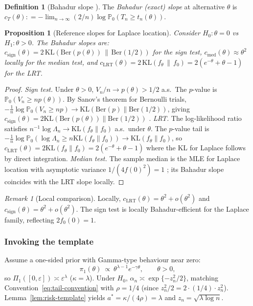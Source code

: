 \documentclass[11pt]{article}
\newcommand{\defeq}{\mathrel{\mathop:}=}
\newcommand{\KL}{\mathrm{KL}}
\newcommand{\rhotail}{\rho}  %
\newcommand{\1}{\mathbf{1}}
\newcommand{\PP}{\mathbb{P}}
\theoremstyle{plain}
\newtheorem{proposition}[theorem]{Proposition}
\theoremstyle{definition}
\newtheorem{definition}[theorem]{Definition}
\theoremstyle{remark}
\newtheorem{remark}[theorem]{Remark}
\begin{document}
\begin{definition}[Bahadur slope {\citep{Bahadur1960, Sievers1969}}]\label{def:bahadur-slope}
The \emph{Bahadur (exact) slope} at alternative $\theta$ is
$c_T(\theta) \defeq -\lim_{n\to\infty}(2/n)\log\PP_{0}(T_n\ge t_n(\theta))$.
\end{definition}

\begin{proposition}[Reference slopes for Laplace location]\label{prop:laplace-bahadur}
Consider $H_0:\theta=0$ vs $H_1:\theta>0$.
The Bahadur slopes are:
$c_{\mathrm{sign}}(\theta) = 2\,\KL(\mathrm{Ber}(p(\theta))\,\|\,\mathrm{Ber}(1/2))$ for the sign test,
$c_{\mathrm{med}}(\theta)\approx \theta^2$ locally for the median test, and
$c_{\mathrm{LRT}}(\theta) = 2\,\KL(f_{\theta}\,\|\,f_0) = 2(e^{-\theta}+\theta-1)$ for the LRT.
\end{proposition}

\begin{proof}
\emph{Sign test.}
Under $\theta>0$, $V_n/n\to p(\theta)>1/2$ a.s.\ The $p$-value is $\PP_0(V_n\ge np(\theta))$.
By Sanov's theorem for Bernoulli trials, $-\frac{1}{n}\log\PP_0(V_n\ge np)\to \KL(\mathrm{Ber}(p)\|\mathrm{Ber}(1/2))$, giving $c_{\mathrm{sign}}(\theta)=2\KL(\mathrm{Ber}(p(\theta))\|\mathrm{Ber}(1/2))$ \citep[see][]{Bahadur1960}.
\emph{LRT.}
The log-likelihood ratio satisfies $n^{-1}\log\Lambda_n\to \KL(f_\theta\|f_0)$ a.s.\ under $\theta$.
The $p$-value tail is $-\frac{1}{n}\log\PP_0(\log\Lambda_n\ge n\KL(f_\theta\|f_0))\to \KL(f_\theta\|f_0)$, so $c_{\mathrm{LRT}}(\theta)=2\KL(f_\theta\|f_0)=2(e^{-\theta}+\theta-1)$ where the KL for Laplace follows by direct integration.
\emph{Median test.}
The sample median is the MLE for Laplace location with asymptotic variance $1/(4f(0)^2)=1$ \citep{HajekSidak1967}; its Bahadur slope coincides with the LRT slope locally.
\end{proof}

\begin{remark}[Local comparison]
Locally, $c_{\mathrm{LRT}}(\theta)=\theta^2+o(\theta^2)$ and $c_{\mathrm{sign}}(\theta)=\theta^2+o(\theta^2)$.
The sign test is locally Bahadur-efficient for the Laplace family, reflecting $2f_0(0)=1$.
\end{remark}

\subsubsection{Invoking the template}

Assume a one-sided prior with Gamma-type behaviour near zero:
\begin{equation}\label{eq:laplace-prior}
  \pi_1(\theta)\ \propto\ \theta^{\lambda-1}e^{-\gamma\theta},\qquad \theta>0,
\end{equation}
so $\Pi_1([0,\varepsilon])\asymp \varepsilon^{\lambda}$ ($\kappa = \lambda$).
Under $H_0$, $\alpha_n \asymp \exp\{-z_n^2/2\}$, matching Convention~\eqref{eq:tail-convention} with $\rhotail = 1/4$ (since $z_n^2/2 = 2\cdot(1/4)\cdot z_n^2$).
Lemma~\ref{lem:risk-template} yields $a^{*} = \kappa/(4\rhotail) = \lambda$ and $z_n = \sqrt{\lambda\log n}$.
\end{document}
